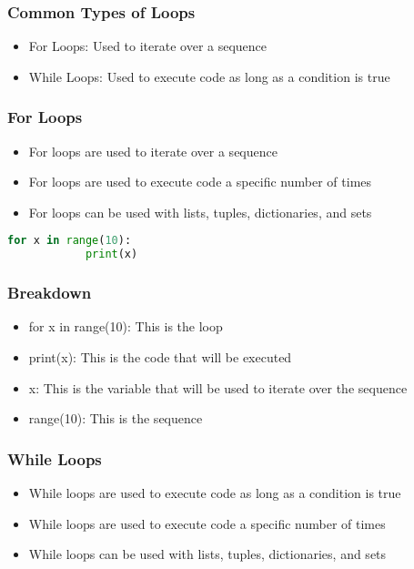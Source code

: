 \documentclass[serif, 9pt, aspectratio=32]{beamer}
\begin{document}
\begin{frame}
    \centering
    \frametitle{Common Types of Loops}
    \begin{itemize}
        \setlength{\itemsep}{3em}
        \item For Loops: Used to iterate over a sequence
        \item While Loops: Used to execute code as long as a condition is true
    \end{itemize}
\end{frame}

\begin{frame}
    \centering
    \frametitle{For Loops}
    \begin{itemize}
        \setlength{\itemsep}{3em}
        \item For loops are used to iterate over a sequence
        \item For loops are used to execute code a specific number of times
        \item For loops can be used with lists, tuples, dictionaries, and sets
    \end{itemize}
\end{frame}

\begin{frame}[fragile]
    \begin{lstlisting}[language=Python]
        for x in range(10):
            print(x)
    \end{lstlisting}
\end{frame}

\begin{frame}
    \centering
    \frametitle{Breakdown}
    \begin{itemize}
        \setlength{\itemsep}{3em}
        \item for x in range(10): This is the loop
        \item print(x): This is the code that will be executed
        \item x: This is the variable that will be used to iterate over the sequence
        \item range(10): This is the sequence
    \end{itemize}
\end{frame}

\begin{frame}
    \centering
    \frametitle{While Loops}
    \begin{itemize}
        \setlength{\itemsep}{3em}
        \item While loops are used to execute code as long as a condition is true
        \item While loops are used to execute code a specific number of times
        \item While loops can be used with lists, tuples, dictionaries, and sets
    \end{itemize}
\end{frame}
\end{document}
